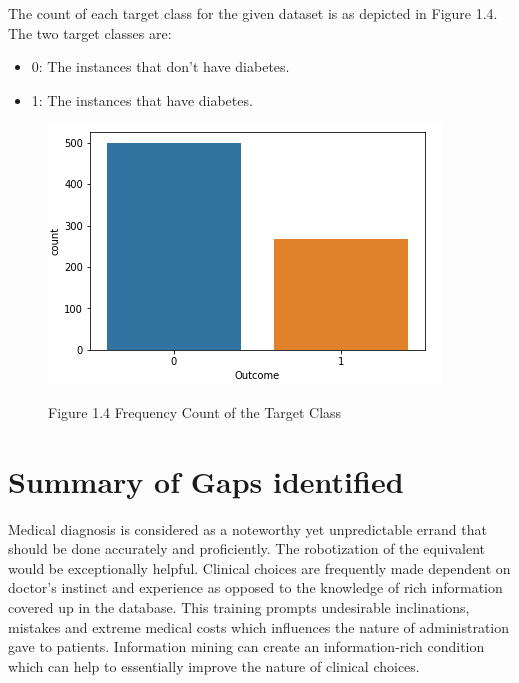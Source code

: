 \documentclass[oneside,12pt]{Classes/VTU}
\begin{document}
	\pagebreak
	The count of each target class for the given dataset is as depicted in Figure 1.4.
	\\
	The two target classes are:
	\begin{itemize}
		\item 0: The instances that don’t have diabetes.
		\item 1: The instances that have diabetes.
	\end{itemize}

	\begin{figure}	
		\begin{center}
			\includegraphics[scale=0.6]{images/diabetescount.png}
		\end{center}
		\begin{center}
			Figure 1.4 Frequency Count of the Target Class
		\end{center}
	\end{figure}
    
 
    
   \section{Summary of Gaps identified}
   Medical diagnosis is considered as a noteworthy yet unpredictable errand that should be done accurately and proficiently. The robotization of the equivalent would be exceptionally helpful. Clinical choices are frequently made dependent on doctor's instinct and experience as opposed to the knowledge of rich information covered up in the database. This training prompts undesirable inclinations, mistakes and extreme medical costs which influences the nature of administration gave to patients. Information mining can create an information-rich condition which can help to essentially improve the nature of clinical choices.
   
   
   
\end{document}
